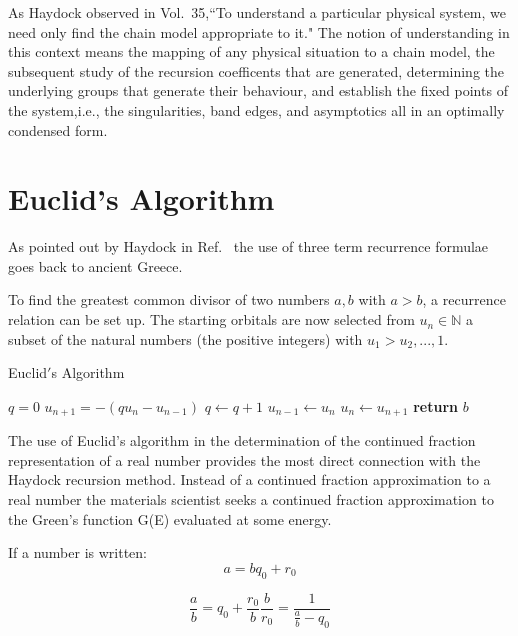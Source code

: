 As Haydock observed in Vol.~35,``To understand a 
particular physical system, we need only find the chain model appropriate to it."
The notion of understanding in this context means the mapping of any physical
situation to a chain model, the subsequent study of the recursion coefficents 
that are generated, determining the underlying groups that generate their behaviour, 
and establish the fixed points of the system,i.e., the singularities, band edges, 
and asymptotics all in an optimally condensed form.

\section{Euclid's Algorithm}
As pointed out by Haydock in Ref.~\cite{weaire85} the 
use of three term recurrence formulae goes back to 
ancient Greece. 

To find the greatest common divisor of two numbers $a,b$ with
$a>b$, a recurrence relation can be set up. The starting orbitals are now 
selected from ${u_{n}}\in\mathbb{N}$ a subset of the 
natural numbers (the positive integers) with ${u_1>u_2,...,1}$.

\begin{algorithm}
\caption{Euclid$'$s Algorithm}\label{alg:euclid}
\begin{algorithmic}[1]
\State $q = 0$
\State $u_{n+1} = -(qu_{n} - u_{n-1})$
\State $q \gets q+1$
\EndWhile\label{quotientwhile}
\State $u_{n-1} \gets u_{n}$
\State $u_{n} \gets u_{n+1}$
\EndWhile\label{euclidendwhile}
\State \textbf{return} $b$
\EndProcedure
\end{algorithmic}
\end{algorithm}

The use of Euclid's algorithm in the determination of 
the continued fraction representation of a real number
provides the most direct connection with the Haydock recursion
method. Instead of a continued fraction approximation to a real
number the materials scientist seeks a continued fraction
approximation to the Green's function G(E) evaluated 
at some energy.

If a number is written:
\begin{equation}
a=bq_{0} + r_{0}
\end{equation}

\begin{equation}
\frac{a}{b} = q_{0} + \frac{r_{0}}{b}
\frac{b}{r_{0}} = \frac{1}{\frac{a}{b} - q_{0}}
\end{equation}

